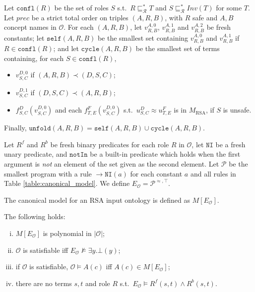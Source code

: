 \documentclass[runningheads]{llncs}
\begin{document}
\begin{definition}\label{def:canonical_model}
    Let $\texttt{confl}(R)$ be the set of roles $S$ s.t.\ $R \sqsubseteq^*_\mathcal{R} T$ and $S \sqsubseteq^*_\mathcal{R} Inv(T)$ for some $T$.
    Let $prec$ be a strict total order on triples $(A,R,B)$, with $R$ safe and $A, B$ concept names in $\mathcal{O}$.
    For each $(A,R,B)$, let $v^{A,0}_{R,B}$, $v^{A,1}_{R,B}$ and $v^{A,2}_{R,B}$ be fresh constants;
    let $\texttt{self}(A,R,B)$ be the smallest set containing $v^{A,0}_{R,B}$ and $v^{A,1}_{R,B}$ if $R \in \texttt{confl}(R)$;
    and let $\texttt{cycle}(A,R,B)$ be the smallest set of terms containing, for each $S \in \texttt{confl}(R)$,
    \begin{itemize}
        \item
            $v^{D,0}_{S,C}$ if $(A,R,B) \prec (D,S,C)$;
        \item
            $v^{D,1}_{S,C}$ if $(D,S,C) \prec (A,R,B)$;
        \item
            $f^{D}_{S,C}(v^{D,0}_{S,C})$ and each $f^{F}_{T,E}(v^{D,0}_{S,C})$ s.t.\ $u^{D}_{S,C} \approx u^{F}_{T,E}$ is in $M_\text{RSA}$, if $S$ is unsafe.
    \end{itemize}
    Finally, $\texttt{unfold}(A,R,B) = \texttt{self}(A,R,B) \cup \texttt{cycle}(A,R,B)$.

    Let $R^f$ and $R^b$ be fresh binary predicates for each role $R$ in $\mathcal{O}$, let $\texttt{NI}$ be a fresh unary predicate, and $\texttt{notIn}$ be a built-in predicate which holds when the first argument is \emph{not} an element of the set given as the second element.
    Let $\mathcal{P}$ be the smallest program with a rule $\rightarrow \texttt{NI}(a)$ for each constant $a$ and all rules in Table \ref{table:canonical_model}.
    We define $E_\mathcal{O} = \mathcal{P}^{\approx,\top}$.
\end{definition}

The canonical model for an RSA input ontology is defined as $M[E_\mathcal{O}]$.

\begin{theorem}
    The following holds:
    \begin{enumerate}[(i)]
        \item
            $M[E_\mathcal{O}]$ is polynomial in $|\mathcal{O}|$;
        \item
            $\mathcal{O}$ is satisfiable iff $E_\mathcal{O} \not\models \exists y . \bot(y)$;
        \item
            if $\mathcal{O}$ is satisfiable, $\mathcal{O} \models A(c)$ iff $A(c) \in M[E_\mathcal{O}]$;
        \item
            there are no terms $s,t$ and role $R$ s.t.\ $E_\mathcal{O} \models R^f(s,t) \land R^b(s,t)$.
    \end{enumerate}
\end{theorem}
\end{document}
